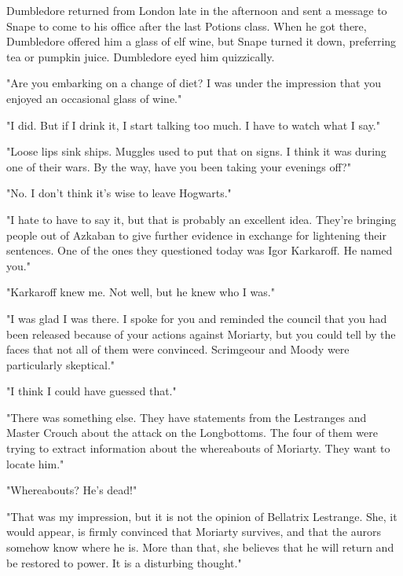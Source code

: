 Dumbledore returned from London late in the afternoon and sent a message to Snape to come to his office after the last Potions class. When he got there, Dumbledore offered him a glass of elf wine, but Snape turned it down, preferring tea or pumpkin juice. Dumbledore eyed him quizzically.

"Are you embarking on a change of diet? I was under the impression that you enjoyed an occasional glass of wine."

"I did. But if I drink it, I start talking too much. I have to watch what I say."

"Loose lips sink ships. Muggles used to put that on signs. I think it was during one of their wars. By the way, have you been taking your evenings off?"

"No. I don't think it's wise to leave Hogwarts."

"I hate to have to say it, but that is probably an excellent idea. They're bringing people out of Azkaban to give further evidence in exchange for lightening their sentences. One of the ones they questioned today was Igor Karkaroff. He named you."

"Karkaroff knew me. Not well, but he knew who I was."

"I was glad I was there. I spoke for you and reminded the council that you had been released because of your actions against Moriarty, but you could tell by the faces that not all of them were convinced. Scrimgeour and Moody were particularly skeptical."

"I think I could have guessed that."

"There was something else. They have statements from the Lestranges and Master Crouch about the attack on the Longbottoms. The four of them were trying to extract information about the whereabouts of Moriarty. They want to locate him."

"Whereabouts? He's dead!"

"That was my impression, but it is not the opinion of Bellatrix Lestrange. She, it would appear, is firmly convinced that Moriarty survives, and that the aurors somehow know where he is. More than that, she believes that he will return and be restored to power. It is a disturbing thought."


